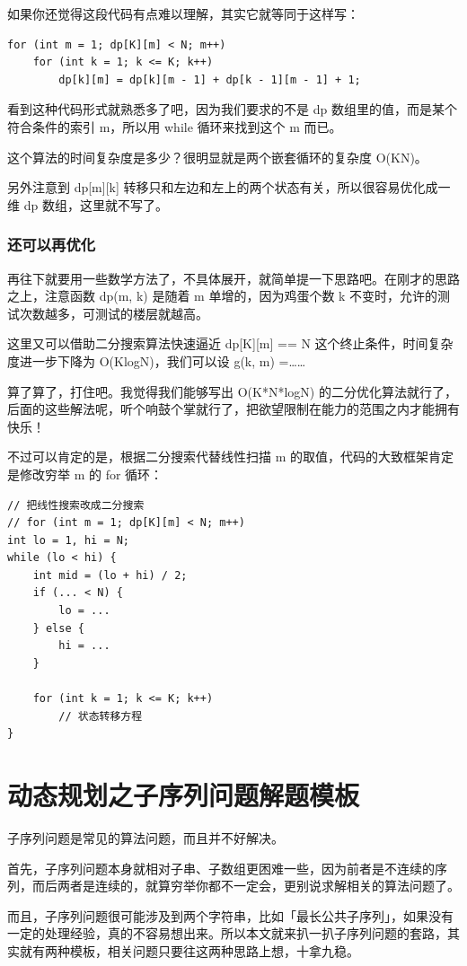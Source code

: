 \documentclass[12pt]{article}
\begin{document}
如果你还觉得这段代码有点难以理解，其实它就等同于这样写：
\begin{lstlisting}
for (int m = 1; dp[K][m] < N; m++)
    for (int k = 1; k <= K; k++)
        dp[k][m] = dp[k][m - 1] + dp[k - 1][m - 1] + 1;
\end{lstlisting}

看到这种代码形式就熟悉多了吧，因为我们要求的不是 dp 数组里的值，而是某个符合条件的索引 m，所以用 while 循环来找到这个 m 而已。

这个算法的时间复杂度是多少？很明显就是两个嵌套循环的复杂度 O(KN)。

另外注意到 dp[m][k] 转移只和左边和左上的两个状态有关，所以很容易优化成一维 dp 数组，这里就不写了。

\subsubsection{还可以再优化}
再往下就要用一些数学方法了，不具体展开，就简单提一下思路吧。在刚才的思路之上，注意函数 dp(m, k) 是随着 m 单增的，因为鸡蛋个数 k 不变时，允许的测试次数越多，可测试的楼层就越高。

这里又可以借助二分搜索算法快速逼近 dp[K][m] == N 这个终止条件，时间复杂度进一步下降为 O(KlogN)，我们可以设 g(k, m) =……

算了算了，打住吧。我觉得我们能够写出 O(K*N*logN) 的二分优化算法就行了，后面的这些解法呢，听个响鼓个掌就行了，把欲望限制在能力的范围之内才能拥有快乐！

不过可以肯定的是，根据二分搜索代替线性扫描 m 的取值，代码的大致框架肯定是修改穷举 m 的 for 循环：
\begin{lstlisting}
// 把线性搜索改成二分搜索
// for (int m = 1; dp[K][m] < N; m++)
int lo = 1, hi = N;
while (lo < hi) {
    int mid = (lo + hi) / 2;
    if (... < N) {
        lo = ...
    } else {
        hi = ...
    }
    
    for (int k = 1; k <= K; k++)
        // 状态转移方程
}
\end{lstlisting}

\section{动态规划之子序列问题解题模板}
子序列问题是常见的算法问题，而且并不好解决。

首先，子序列问题本身就相对子串、子数组更困难一些，因为前者是不连续的序列，而后两者是连续的，就算穷举你都不一定会，更别说求解相关的算法问题了。

而且，子序列问题很可能涉及到两个字符串，比如「最长公共子序列」，如果没有一定的处理经验，真的不容易想出来。所以本文就来扒一扒子序列问题的套路，其实就有两种模板，相关问题只要往这两种思路上想，十拿九稳。
\end{document}
